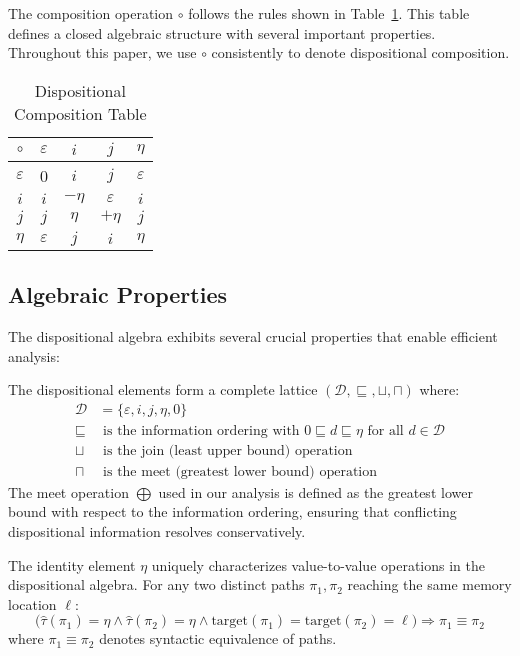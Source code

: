 \documentclass[journal]{IEEEtran}
\begin{document}
The composition operation $\circ$ follows the rules shown in Table~\ref{tab:composition}. This table defines a closed algebraic structure with several important properties. Throughout this paper, we use $\circ$ consistently to denote dispositional composition.

\begin{table}[t]
\centering
\caption{Dispositional Composition Table}
\label{tab:composition}
\begin{tabular}{c|cccc}
\toprule
$\circ$ & $\varepsilon$ & $i$ & $j$ & $\eta$ \\
\midrule
$\varepsilon$ & 0 & $i$ & $j$ & $\varepsilon$ \\
$i$ & $i$ & $-\eta$ & $\varepsilon$ & $i$ \\
$j$ & $j$ & $\eta$ & $+\eta$ & $j$ \\
$\eta$ & $\varepsilon$ & $j$ & $i$ & $\eta$ \\
\bottomrule
\end{tabular}
\end{table}

\subsection{Algebraic Properties}

The dispositional algebra exhibits several crucial properties that enable efficient analysis:

\begin{definition}
The dispositional elements form a complete lattice $(\mathcal{D}, \sqsubseteq, \sqcup, \sqcap)$ where:
\begin{align}
\mathcal{D} &= \{\varepsilon, i, j, \eta, 0\} \\
\sqsubseteq &\text{ is the information ordering with } 0 \sqsubseteq d \sqsubseteq \eta \text{ for all } d \in \mathcal{D} \\
\sqcup &\text{ is the join (least upper bound) operation} \\
\sqcap &\text{ is the meet (greatest lower bound) operation}
\end{align}
The meet operation $\bigoplus$ used in our analysis is defined as the greatest lower bound with respect to the information ordering, ensuring that conflicting dispositional information resolves conservatively.
\end{definition}

\begin{lemma}
\label{lem:uniqueness}
The identity element $\eta$ uniquely characterizes value-to-value operations in the dispositional algebra. For any two distinct paths $\pi_1, \pi_2$ reaching the same memory location $\ell$:
$$\big( \hat{\tau}(\pi_1) = \eta \land \hat{\tau}(\pi_2) = \eta \land \text{target}(\pi_1) = \text{target}(\pi_2) = \ell \big) \Rightarrow \pi_1 \equiv \pi_2$$
where $\pi_1 \equiv \pi_2$ denotes syntactic equivalence of paths.
\end{lemma}
\end{document}
